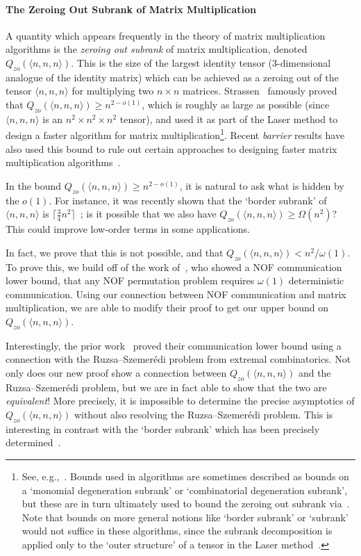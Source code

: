     \paragraph{The Zeroing Out Subrank of Matrix Multiplication}
    A quantity which appears frequently in the theory of matrix multiplication algorithms is the \emph{zeroing out subrank} of matrix multiplication, denoted $Q_{zo}(\langle n,n,n \rangle)$. This is the size of the largest identity tensor (3-dimensional analogue of the identity matrix) which can be achieved as a zeroing out of the tensor $\langle n,n,n \rangle$ for multiplying two $n \times n$ matrices. Strassen~\cite{S86} famously proved that $Q_{zo}(\langle n,n,n \rangle) \geq n^{2 - o(1)}$, which is roughly as large as possible (since $\langle n,n,n \rangle$ is an $n^2 \times n^2 \times n^2$ tensor), and used it as part of the Laser method to design a faster algorithm for matrix multiplication\footnote{See, e.g.,~\cite[Section 8]{B13}. Bounds used in algorithms are sometimes described as bounds on a `monomial degeneration subrank' or `combinatorial degeneration subrank', but these are in turn ultimately used to bound the zeroing out subrank via~\cite{B80}. Note that bounds on more general notions like `border subrank' or `subrank' would not suffice in these algorithms, since the subrank decomposition is applied only to the `outer structure' of a tensor in the Laser method~\cite{S86}.}. Recent \emph{barrier} results have also used this bound to rule out certain approaches to designing faster matrix multiplication algorithms~\cite{AW21,A21,CVZ21}.

    In the bound $Q_{zo}(\langle n,n,n \rangle) \geq n^{2 - o(1)}$, it is natural to ask what is hidden by the $o(1)$. For instance, it was recently shown that the `border subrank' of $\langle n,n,n \rangle$ is $\lceil \frac34 n^2 \rceil$~\cite{KMZ20}; is it possible that we also have $Q_{zo}(\langle n,n,n \rangle) \geq \Omega(n^2)$? This could improve low-order terms in some applications.
    
    In fact, we prove that this is not possible, and that $Q_{zo}(\langle n,n,n \rangle) < n^2 / \omega(1)$. To prove this, we build off of the work of~\cite{LPS17}, who showed a NOF communication lower bound, that any NOF permutation problem requires $\omega(1)$ deterministic communication. Using our connection between NOF communication and matrix multiplication, we are able to modify their proof to get our upper bound on $Q_{zo}(\langle n,n,n \rangle)$.
    
    Interestingly, the prior work~\cite{LPS17} proved their communication lower bound using a connection with the Ruzsa–Szemerédi problem from extremal combinatorics. Not only does our new proof show a connection between $Q_{zo}(\langle n,n,n \rangle)$ and the Ruzsa–Szemerédi problem, but we are in fact able to show that the two are \emph{equivalent}! More precisely, it is impossible to determine the precise asymptotics of $Q_{zo}(\langle n,n,n \rangle)$ without also resolving the Ruzsa–Szemerédi problem. This is interesting in contrast with the `border subrank' which has been precisely determined~\cite{KMZ20}.
    
